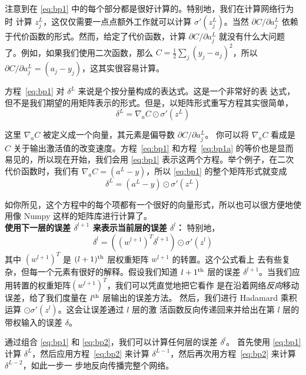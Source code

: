 注意到在 \eqref{eq:bp1} 中的每个部分都是很好计算的。特别地，我们在计算网络行为时
计算 $z_j^L$，这仅仅需要一点点额外工作就可以计算 $\sigma'(z_j^L)$。当然
$\partial C/\partial a_j^L$ 依赖于代价函数的形式。然而，给定了代价函数，计算
$\partial C/\partial a_j^L$ 就没有什么大问题了。例如，如果我们使用二次函数，那么
$C = \frac{1}{2} \sum_j(y_j-a_j)^2$，所以 $\partial C/\partial a_j^L = (a_j -
y_j)$，这其实很容易计算。

方程~\eqref{eq:bp1} 对 $\delta^L$ 来说是个按分量构成的表达式。这是一个非常好的表
达式，但不是我们期望的用矩阵表示的形式。但是，以矩阵形式重写方程其实很简单，
\begin{equation}
  \delta^L = \nabla_a C \odot \sigma'(z^L)
  \label{eq:bp1a}\tag{BP1a}
\end{equation}

这里 $\nabla_a C$ 被定义成一个向量，其元素是偏导数 $\partial C/\partial a_j^L$。
你可以将 $\nabla_a C$ 看成是 $C$ 关于输出激活值的改变速度。方程~\eqref{eq:bp1}
和方程~\eqref{eq:bp1a} 的等价也是显而易见的，所以现在开始，我们会用
\eqref{eq:bp1} 表示这两个方程。举个例子，在二次代价函数时，我们有 $\nabla_a C =
(a^L - y)$，所以 \eqref{eq:bp1} 的整个矩阵形式就变成
\begin{equation}
  \delta^L = (a^L-y) \odot \sigma'(z^L)
  \label{eq:30}\tag{30}
\end{equation}

如你所见，这个方程中的每个项都有一个很好的向量形式，所以也可以很方便地使用像
Numpy 这样的矩阵库进行计算了。\\

\textbf{使用下一层的误差 $\delta^{l+1}$ 来表示当前层的误差 $\delta^l$：} 特别地，
\begin{equation}
  \delta^l = ((w^{l+1})^T \delta^{l+1}) \odot \sigma'(z^l)
  \label{eq:bp2}\tag{BP2}
\end{equation}
其中 $(w^{l+1})^T$ 是 $(l+1)^{\rm th}$ 层权重矩阵 $w^{l+1}$ 的转置。这个公式看上
去有些复杂，但每一个元素有很好的解释。假设我们知道 $l+1^{\rm th}$ 层的误差
$\delta^{l+1}$。当我们应用转置的权重矩阵$(w^{l+1})^T$，我们可以凭直觉地把它看作
是在沿着网络\emph{反向}移动误差，给了我们度量在 $l^{\rm th}$ 层输出的误差方法。
然后，我们进行 Hadamard 乘积运算 $\odot \sigma'(z^l)$。这会让误差通过 $l$ 层的激
活函数反向传递回来并给出在第 $l$ 层的带权输入的误差 $\delta$。

通过组合 \eqref{eq:bp1} 和 \eqref{eq:bp2}，我们可以计算任何层的误差 $\delta^l$。
首先使用 \eqref{eq:bp1} 计算 $\delta^L$，然后应用方程~\eqref{eq:bp2} 来计算
$\delta^{L-1}$，然后再次用方程~\eqref{eq:bp2} 来计算 $\delta^{L-2}$，如此一步一
步地反向传播完整个网络。\\

